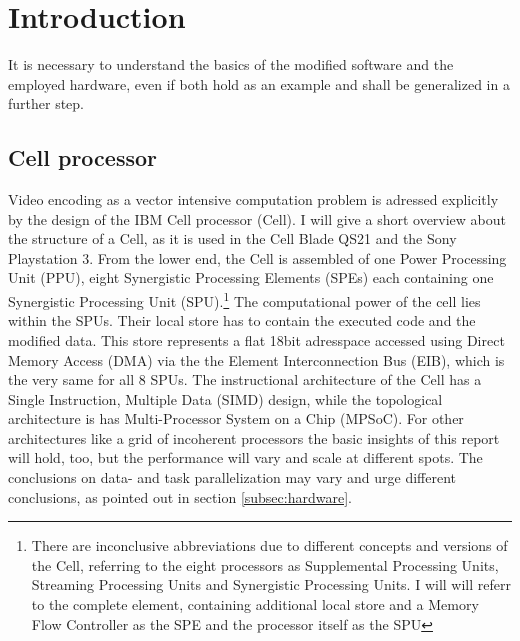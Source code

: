 \section{Introduction}
\label{sec:introduction}
It is necessary to understand the basics of the modified software and the employed hardware, even if both hold as an example and shall be generalized in a further step.

\subsection{Cell processor}
\label{subsec:cell}
Video encoding as a vector intensive computation problem is adressed explicitly by the design of the IBM Cell processor (Cell).\cite{PTC} I will give a short overview about the structure of a Cell, as it is used in the Cell Blade QS21 and the Sony Playstation 3.
From the lower end, the Cell is assembled of one Power Processing Unit (PPU), eight Synergistic Processing Elements (SPEs) each containing one Synergistic Processing Unit (SPU).\footnote{There are inconclusive abbreviations due to different concepts and versions of the Cell, referring to the eight processors as Supplemental Processing Units, Streaming Processing Units and Synergistic Processing Units. I will will referr to the complete element, containing additional local store and a Memory Flow Controller as the SPE and the processor itself as the SPU}
The computational power of the cell lies within the SPUs. Their local store has to contain the executed code and the modified data. This store represents a flat 18bit adresspace accessed using Direct Memory Access (DMA) via the the Element Interconnection Bus (EIB), which is the very same for all 8 SPUs.
The instructional architecture of the Cell has a Single Instruction, Multiple Data (SIMD) design\cite{SIMD}, while the topological architecture is  has Multi-Processor System on a Chip (MPSoC).\cite{scop3} For other architectures like a grid of incoherent processors the basic insights of this report will hold, too, but the performance will vary and scale at different spots. The conclusions on data- and task parallelization may vary and urge different conclusions, as pointed out in section \ref{subsec:hardware}.

